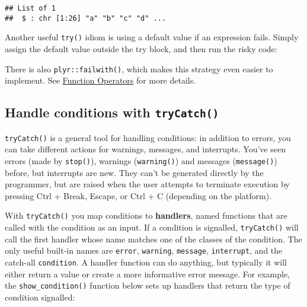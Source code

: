 \begin{Shaded}
\begin{Highlighting}[]
\NormalTok{(elements[}\OperatorTok{!}\NormalTok{succeeded])}
\end{Highlighting}
\end{Shaded}

\begin{verbatim}
## List of 1
##  $ : chr [1:26] "a" "b" "c" "d" ...
\end{verbatim}

Another useful \texttt{try()} idiom is using a default value if an
expression fails. Simply assign the default value outside the try block,
and then run the risky code:

\begin{Shaded}
\begin{Highlighting}[]
\StringTok{ }
\StringTok{ }\NormalTok{(}\NormalTok{), } \NormalTok{)}
\end{Highlighting}
\end{Shaded}

There is also \texttt{plyr::failwith()}, which makes this strategy even
easier to implement. See \protect\hyperlink{output-fos}{Function
Operators} for more details.

\hypertarget{handle-conditions-with-trycatch}{%
\subsection{\texorpdfstring{Handle conditions with
\texttt{tryCatch()}}{Handle conditions with tryCatch()}}\label{handle-conditions-with-trycatch}}

\texttt{tryCatch()} is a general tool for handling conditions: in
addition to errors, you can take different actions for warnings,
messages, and interrupts. You've seen errors (made by \texttt{stop()}),
warnings (\texttt{warning()}) and messages (\texttt{message()}) before,
but interrupts are new. They can't be generated directly by the
programmer, but are raised when the user attempts to terminate execution
by pressing Ctrl + Break, Escape, or Ctrl + C (depending on the
platform).  

With \texttt{tryCatch()} you map conditions to \textbf{handlers}, named
functions that are called with the condition as an input. If a condition
is signalled, \texttt{tryCatch()} will call the first handler whose name
matches one of the classes of the condition. The only useful built-in
names are \texttt{error}, \texttt{warning}, \texttt{message},
\texttt{interrupt}, and the catch-all \texttt{condition}. A handler
function can do anything, but typically it will either return a value or
create a more informative error message. For example, the
\texttt{show\_condition()} function below sets up handlers that return
the type of condition signalled: 

